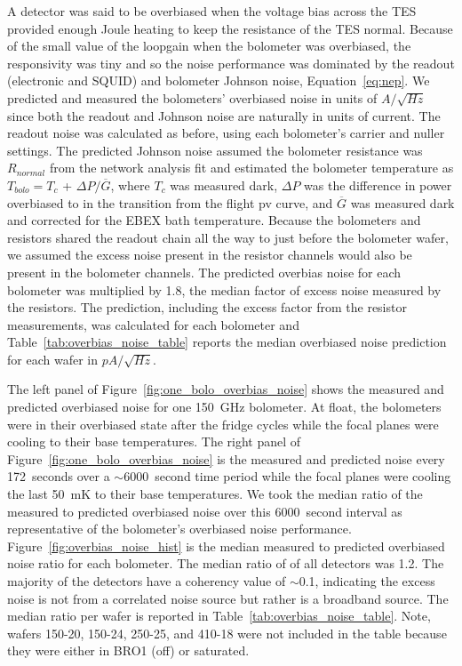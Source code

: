 A detector was said to be overbiased when the voltage bias across the \ac{TES} provided enough Joule heating to keep the resistance of the \ac{TES} normal. 
Because of the small value of the loopgain when the bolometer was overbiased, the responsivity was tiny and so the noise performance was dominated by the readout (electronic and \ac{SQUID}) and bolometer Johnson noise, Equation~\ref{eq:nep}. 
We predicted and measured the bolometers' overbiased noise in units of $A/\sqrt{Hz}$ since both the readout and Johnson noise are naturally in units of current.  
The readout noise was calculated as before, using each bolometer's carrier and nuller settings. 
The predicted Johnson noise assumed the bolometer resistance was $R_{normal}$ from the network analysis fit and estimated the bolometer temperature as $T_{bolo} = T_{c}$ + $\Delta P / \overline{G}$, where $T_c$ was measured dark, $\Delta P$ was the difference in power overbiased to in the transition from the flight pv curve, and $\overline{G}$ was measured dark and corrected for the \ac{EBEX} bath temperature. 
Because the bolometers and resistors shared the readout chain all the way to just before the bolometer wafer, we assumed the excess noise present in the resistor channels would also be present in the bolometer channels. 
The predicted overbias noise for each bolometer was multiplied by 1.8, the median factor of excess noise measured by the resistors. 
The prediction, including the excess factor from the resistor measurements, was calculated for each bolometer and Table~\ref{tab:overbias_noise_table} reports the median overbiased noise prediction for each wafer in $pA/\sqrt{Hz}$. %

The left panel of Figure~\ref{fig:one_bolo_overbias_noise} shows the measured and predicted overbiased noise for one 150~GHz bolometer. 
At float, the bolometers were in their overbiased state after the fridge cycles while the focal planes were cooling to their base temperatures. 
The right panel of Figure~\ref{fig:one_bolo_overbias_noise} is the measured and predicted noise every 172~seconds over a $\sim$6000~second time period while the focal planes were cooling the last 50~mK to their base temperatures.
We took the median ratio of the measured to predicted overbiased noise over this 6000~second interval as representative of the bolometer's overbiased noise performance.
Figure~\ref{fig:overbias_noise_hist} is the median measured to predicted overbiased noise ratio for each bolometer. 
The median ratio of of all detectors was 1.2. 
The majority of the detectors have a coherency value of $\sim$0.1, indicating the excess noise is not from a correlated noise source but rather is a broadband source. 
The median ratio per wafer is reported in Table~\ref{tab:overbias_noise_table}.
Note, wafers 150-20, 150-24, 250-25, and 410-18 were not included in the table because they were either in \ac{BRO}1 (off) or saturated. 

